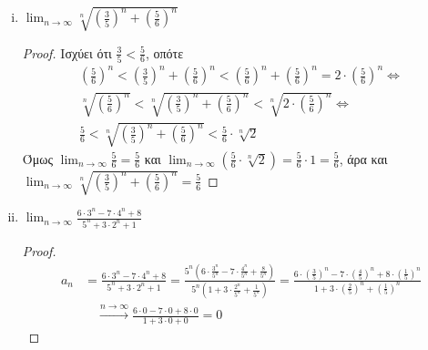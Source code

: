 \begin{enumerate}
\begin{enumerate}[i)]
      \item $ \lim_{n \to \infty} \sqrt[n]{\left(\frac{3}{5}\right)^{n}+
        \left(\frac{5}{6}\right)^{n}} $
        \begin{proof}
          Ισχύει ότι $ \frac{3}{5} < \frac{5}{6} $, οπότε
          \begin{gather*}
            \left(\frac{5}{6}\right)^{n} < \left(\frac{3}{5}\right)^{n}+ 
            \left(\frac{5}{6}\right)^{n} < \left(\frac{5}{6}\right)^{n} + 
            \left(\frac{5}{6}\right)^{n} = 2 \cdot 
            \left(\frac{5}{6}\right)^{n} 
            \Leftrightarrow \\
            \sqrt[n]{\left(\frac{5}{6}\right)^{n}} < 
            \sqrt[n]{\left(\frac{3}{5}\right)^{n}+ 
            \left(\frac{5}{6}\right)^{n}} < 
            \sqrt[n]{2\cdot \left(\frac{5}{6}\right)^{n}} 
            \Leftrightarrow \\
            \frac{5}{6} < \sqrt[n]{\left(\frac{3}{5}\right)^{n}+ 
            \left(\frac{5}{6}\right)^{n}} < \frac{5}{6} \cdot 
            \sqrt[n]{2} 
          \end{gather*}
          Όμως $ \lim_{n \to \infty} \frac{5}{6} = \frac{5}{6} $ και 
          $ \lim_{n \to \infty} \left(\frac{5}{6} \cdot \sqrt[n]{2}\right) = 
          \frac{5}{6} \cdot 1 = \frac{5}{6} $, άρα και $ 
          \lim_{n \to \infty} \sqrt[n]{\left(\frac{3}{5} \right)^{n} + 
          \left(\frac{5}{6}\right)^{n}} = \frac{5}{6} $
        \end{proof}

      \item $ \lim_{n \to \infty} \frac{6\cdot 3^{n}-7 \cdot 4^{n}+8}
        {5^{n}+3\cdot 2^{n}+1} $ 
        \begin{proof}
          \begin{align*}
            a_{n} 
                        &= \frac{6\cdot 3^{n}-7 \cdot 4^{n}+8} {5^{n}+3
                        \cdot 2^{n}+1} = 
                        \frac{5^{n}\left(6\cdot \frac{3^{n}}{5^{n}}  - 7 \cdot 
                            \frac{4^{n}}{5^{n}} + 
                            \frac{8}{5^{n}}\right)}{5^{n}\left(1 + 3 
                        \cdot \frac{2^{n}}{5^{n}} + \frac{1}{5^{n}}\right)} = 
                        \frac{6\cdot (\frac{3}{5} )^{n}-7\cdot (\frac{4}{5} )^{n} +8
                          \cdot ( \frac{1}{5} )^{n}}{1 + 3\cdot (\frac{2}{5} )^{n}+ 
                        (\frac{1}{5} )^{n}} \\
                        & \quad \xrightarrow{n \to \infty}  
                        \frac{6 \cdot 0 -7 \cdot 0 + 8 \cdot 0}{1 + 3 \cdot 0 + 0} = 0  
          \end{align*} 
        \end{proof}


\end{enumerate}
\end{enumerate}
